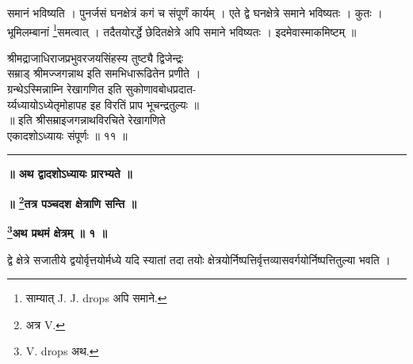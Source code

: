 \documentclass[11pt, openany]{book}
\begin{document}
\newpage
\noindent समानं भविष्यति । पुनर्जसं घनक्षेत्रं कगं च संपूर्णं कार्यम् ।
एते द्वे घनक्षेत्रे समाने भविष्यतः । कुतः । भूमिलम्बानां \renewcommand{\thefootnote}{१}\footnote{साम्यात् {\en J. J. drops} अपि समाने.}समत्वात् ।
तदैतयोरर्द्धे छेदितक्षेत्रे अपि समाने भविष्यतः । इदमेवास्माकमिष्टम्
॥\\
\begin{center}
{\small श्रीमद्राजाधिराजप्रभुवरजयसिंहस्य तुष्ट्यै द्विजेन्द्रः\\
 सम्राड् श्रीमज्जगन्नाथ इति समभिधारूढितेन प्रणीते ।\\
 ग्रन्थेऽस्मिन्नाम्नि रेखागणित इति सुकोणावबोधप्रदात-\\
 र्य्यध्यायोऽध्येतृमोहापह इह विरतिं प्राप भूचन्द्रतुल्यः ॥\\
 ॥ इति श्रीसम्राइजगन्नाथविरचिते रेखागणिते\\
 एकादशोऽध्यायः संपूर्णः ॥ ११ ॥}\\

\rule{0.6in}{0.3pt} 

\end{center}

\newpage
{}
\afterpage{\fancyhead[LE,RO]{\thepage}}
\cfoot{}
\newpage
\newpage
\thispagestyle{empty}
\begin{center}
\textbf{\LARGE ॥ अथ द्वादशोऽध्यायः प्रारभ्यते ॥}
\end{center}
\vspace{3mm}


\begin{center}
\textbf{॥ \renewcommand{\thefootnote}{१}\footnote{अत्र {\en V.} }तत्र पञ्चदश क्षेत्राणि सन्ति ॥}
\vspace{5mm}
  
 
\textbf{\renewcommand{\thefootnote}{२}\footnote{{\en V. drops} अथ.}अथ प्रथमं क्षेत्रम् ॥ १ ॥}\\
\end{center}
\vspace{2mm}

{\ab द्वे क्षेत्रे सजातीये द्वयोर्वृत्तयोर्मध्ये यदि स्यातां तदा तयोः क्षेत्रयोर्निष्पत्तिर्वृत्तव्यासवर्गयोर्निष्पत्तितुल्या भवति ।}\\
\vspace{3mm}
\end{document}
